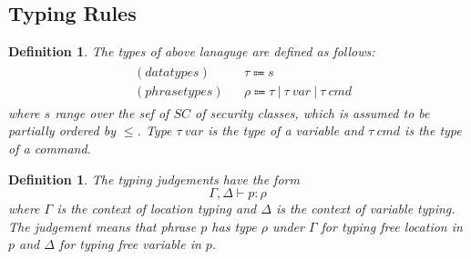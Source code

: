 \documentclass{article}
\newtheorem{definition}[theorem]{Definition}
\begin{document}
\subsection{Typing Rules}

\begin{definition}
\rm The types of above lanaguge are defined as follows:
\[
	\begin{gathered}
	\begin{aligned}
	&(data types) && \tau \Coloneqq s \\
	&(phrase types) && \rho \Coloneqq \tau ~|~ \tau~var ~|~ \tau~cmd 
	\end{aligned}
	\end{gathered}
\]
where $s$ range over the sef of $SC$ of security classes, which is assumed to be partially ordered by $\leq$. Type $\tau~var$ is the type of a variable and $\tau~cmd$ is the type of a command. 
\end{definition}

\begin{definition}
\rm The typing judgements have the form
\[
	\Gamma, \Delta \vdash p: \rho
\]
where $\Gamma$ is the context of location typing and $\Delta$ is the context of variable typing. The judgement means that phrase $p$ has type $\rho$ under $\Gamma$ for typing free location in $p$ and $\Delta$ for typing free variable in $p$.
\end{definition}
\end{document}
